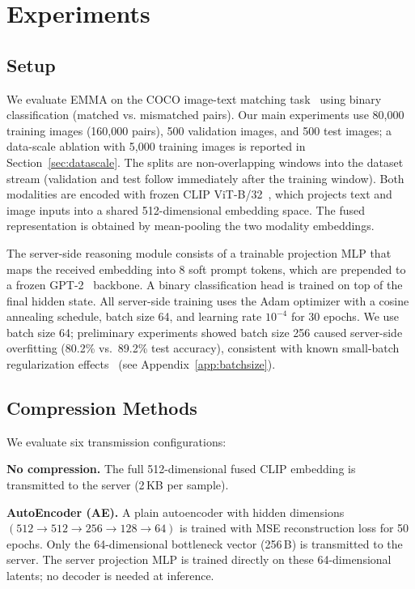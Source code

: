 \section{Experiments}

\subsection{Setup}

We evaluate EMMA on the COCO image-text matching task~\cite{lin2014microsoft} using binary classification (matched vs. mismatched pairs). Our main experiments use 80{,}000 training images (160{,}000 pairs), 500 validation images, and 500 test images; a data-scale ablation with 5{,}000 training images is reported in Section~\ref{sec:datascale}. The splits are non-overlapping windows into the dataset stream (validation and test follow immediately after the training window). Both modalities are encoded with frozen CLIP ViT-B/32~\cite{radford2021learning}, which projects text and image inputs into a shared 512-dimensional embedding space. The fused representation is obtained by mean-pooling the two modality embeddings.

The server-side reasoning module consists of a trainable projection MLP that maps the received embedding into 8 soft prompt tokens, which are prepended to a frozen GPT-2~\cite{radford2019language} backbone. A binary classification head is trained on top of the final hidden state. All server-side training uses the Adam optimizer with a cosine annealing schedule, batch size 64, and learning rate $10^{-4}$ for 30 epochs. We use batch size 64; preliminary experiments showed batch size 256 caused server-side overfitting (80.2\% vs.\ 89.2\% test accuracy), consistent with known small-batch regularization effects~\cite{keskar2017large} (see Appendix~\ref{app:batchsize}).

\subsection{Compression Methods}

We evaluate six transmission configurations:

\textbf{No compression.} The full 512-dimensional fused CLIP embedding is transmitted to the server (2\,KB per sample).

\textbf{AutoEncoder (AE).} A plain autoencoder with hidden dimensions $(512 \to 512 \to 256 \to 128 \to 64)$ is trained with MSE reconstruction loss for 50 epochs. Only the 64-dimensional bottleneck vector (256\,B) is transmitted to the server. The server projection MLP is trained directly on these 64-dimensional latents; no decoder is needed at inference.

